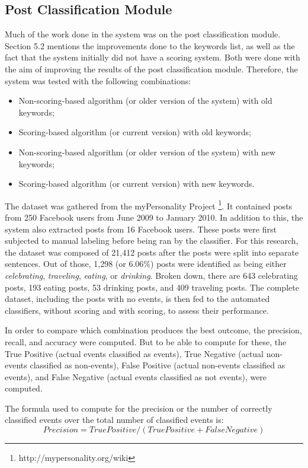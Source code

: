 \subsection{Post Classification Module}
Much of the work done in the system was on the post classification module. Section 5.2 mentions the improvements done to the keywords list, as well as the fact that the system initially did not have a scoring system. Both were done with the aim of improving the results of the post classification module. Therefore, the system was tested with the following combinations:
\begin{itemize}
	\item Non-scoring-based algorithm (or older version of the system) with old keywords;
	\item Scoring-based algorithm (or current version) with old keywords;
	\item Non-scoring-based algorithm (or older version of the system) with new keywords;
	\item Scoring-based algorithm (or current version) with new keywords.
\end{itemize}

The dataset was gathered from the myPersonality Project \footnote{http://mypersonality.org/wiki}. It contained posts from 250 Facebook users from June 2009 to January 2010. In addition to this, the system also extracted posts from 16 Facebook users. These posts were first subjected to manual labeling before being ran by the classifier. For this research, the dataset was composed of 21,412 posts after the posts were split into separate sentences. Out of those, 1,298 (or 6.06\%) posts were identified as being either \textit{celebrating}, \textit{traveling}, \textit{eating}, or \textit{drinking}. Broken down, there are 643 celebrating posts, 193 eating posts, 53 drinking posts, and 409 traveling posts. The complete dataset, including the posts with no events, is then fed to the automated classifiers, without scoring and with scoring, to assess their performance. 

In order to compare which combination produces the best outcome, the precision, recall, and accuracy were computed. But to be able to compute for these, the True Positive (actual events classified as events), True Negative (actual non-events classified as non-events), False Positive (actual non-events classified as events), and False Negative (actual events classified as not events), were computed.

The formula used to compute for the precision or the number of correctly classified events over the total number of classified events is:
\begin{equation}
Precision = True Positive / (True Positive + False Negative)
\end{equation}

